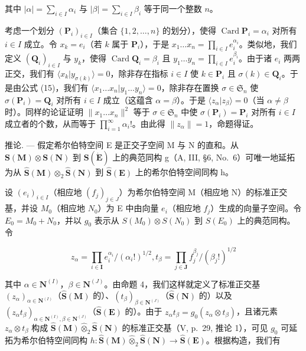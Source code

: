 其中 \(|\alpha| = \sum_{i \in I} \alpha_i\) 与 \(|\beta| = \sum_{i \in I} \beta_i\) 等于同一个整数 \(n\)。

考虑一个划分 \((\mathbf{P}_i)_{i\in I}\)（集合 \(\{1,2,\dots,n\}\) 的划分），使得 \(\operatorname{Card} \mathbf{P}_i = \alpha_i\) 对所有 \(i\in I\) 成立。令 \(x_k = e_i\)（若 \(k\) 属于 \(\mathbf{P}_i\)），于是 \(x_1\ldots x_n = \prod_{i\in I}e_i^{\alpha_i}\)。类似地，我们定义 \((\mathbf{Q}_i)_{i\in I}\) 与 \(y_k\)，使得 \(\operatorname{Card} \mathbf{Q}_i = \beta_i\) 且 \(y_1\ldots y_n = \prod_{i\in I}e_i^{\beta_i}\)。由于诸 \(e_i\) 两两正交，我们有 \(\langle x_k|y_{\sigma(k)}\rangle = 0\)，除非存在指标 \(i\in I\) 使 \(k\in \mathbf{P}_i\) 且 \(\sigma (k)\in \mathbf{Q}_i\)。于是由公式 (15)，我们有 \(\langle x_1\ldots x_n|y_1\ldots y_n\rangle = 0\)，除非存在置换 \(\sigma \in \mathfrak{S}_n\) 使 \(\sigma (\mathbf{P}_i) = \mathbf{Q}_i\) 对所有 \(i\in I\) 成立（这蕴含 \(\alpha = \beta\)）。于是 \(\langle z_{\alpha}|z_{\beta}\rangle = 0\)（当 \(\alpha \neq \beta\) 时）。同样的论证证明 \(\| x_1\ldots x_n\|^2\) 等于 \(\sigma \in \mathfrak{S}_n\) 中使 \(\sigma (\mathbf{P}_i) = \mathbf{P}_i\) 对所有 \(i\in I\) 成立者的个数，从而等于 \(\prod_{i=1}^{\infty}\alpha_i!\)。由此得 \(\| z_\alpha \| = 1\)，命题得证。

推论. --- 假定希尔伯特空间 E 是正交子空间 M 与 N 的直和。从 \(\mathbf{S}(\mathbf{M}) \otimes \mathbf{S}(\mathbf{N})\) 到 \(\mathbf{S}(\dot{\mathbf{E}})\) 上的典范同构 g（A, III, §6, No.~6）可唯一地延拓为从 \(\hat{\mathbf{S}}(\mathbf{M}) \otimes_{2} \hat{\mathbf{S}}(\mathbf{N})\) 到 \(\hat{\mathbf{S}}(\mathbf{E})\) 上的希尔伯特空间同构 h。

设 \((e_{i})_{i\in I}\)（相应地 \((f_{j})_{j\in J}\)）为希尔伯特空间 M（相应地 N）的标准正交基，并设 \(M_{0}\)（相应地 \(N_{0}\)）为 E 中由向量 \(e_{i}\)（相应地 \(f_{j}\)）生成的向量子空间。令 \(E_{0}=M_{0}+N_{0}\)，并以 \(g_{0}\) 表示从 \(S(M_{0})\otimes S(N_{0})\) 到 \(S(E_{0})\) 上的典范同构。令

\[
z _ {\alpha} = \prod_ {i \in \mathbf {I}} e _ {i} ^ {\alpha_ {i}} / (\alpha_ {i}!) ^ {1 / 2}, t _ {\beta} = \prod_ {j \in \mathbf {J}} f _ {j} ^ {\beta _ {j}} / (\beta_ {j}!) ^ {1 / 2}
\]

其中 \(\alpha \in \mathbf{N}^{(I)}\)，\(\beta \in \mathbf{N}^{(J)}\)。由命题 4，我们这样就定义了标准正交基 \((z_{\alpha})_{\alpha \in \mathbf{N}^{(I)}}\)（\(\hat{\mathbf{S}}(\mathbf{M})\) 的）、\((t_{\beta})_{\beta \in \mathbf{N}^{(J)}}\)（\(\hat{\mathbf{S}}(\mathbf{N})\) 的）以及 \((z_{\alpha}t_{\beta})_{\alpha \in \mathbf{N}^{(I)},\beta \in \mathbf{N}^{(J)}}\)（\(\hat{\mathbf{S}}(\mathbf{E})\) 的）。由于 \(z_{\alpha}t_{\beta} = g_0(z_{\alpha}\otimes t_{\beta})\)，且诸元素 \(z_{\alpha}\otimes t_{\beta}\) 构成 \(\hat{\mathbf{S}}(\mathbf{M})\hat{\otimes}_2\hat{\mathbf{S}}(\mathbf{N})\) 的标准正交基（V, p.~29, 推论 1），可见 \(g_0\) 可延拓为希尔伯特空间同构 \(h:\hat{\mathbf{S}}(\mathbf{M})\hat{\otimes}_2\hat{\mathbf{S}}(\mathbf{N})\to \hat{\mathbf{S}}(\mathbf{E})\)。根据构造，我们有

